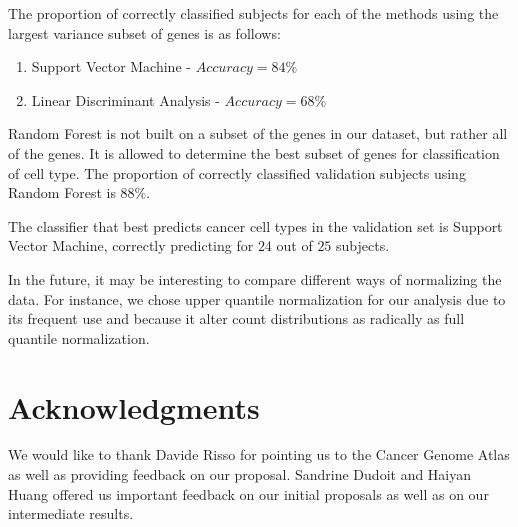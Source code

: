The proportion of correctly classified subjects for each of the methods using the largest variance subset of
genes is as follows:
\begin{enumerate}
\item Support Vector Machine - $Accuracy = 84\% $
\item Linear Discriminant Analysis - $Accuracy =68\% $
\end{enumerate}

Random Forest is not built on a subset of the genes in our dataset, but rather all of the genes. It is allowed
to determine the best subset of genes for classification of cell type. The proportion of correctly 
classified validation subjects using Random Forest is $88\%$.

The classifier that best predicts cancer cell types in the validation set is Support Vector Machine, 
correctly predicting for $24$ out of $25$ subjects.

In the future,  it may be interesting to compare different ways of normalizing the data. For instance,
we chose upper quantile normalization for our analysis due to its frequent use and because it alter 
count distributions as radically as full quantile normalization.
\section*{Acknowledgments}

We would like to thank Davide Risso for pointing us to the Cancer Genome Atlas
as well as providing feedback on our proposal. Sandrine Dudoit and Haiyan Huang
offered us important feedback on our initial proposals as well as on our
intermediate results. 




